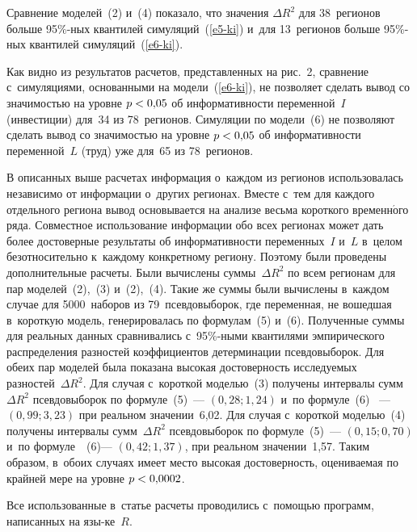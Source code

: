 \begin{multicols}{2}
   
  Сравнение моделей~(2) и~(4) показало, что значения $\Delta R^2$ для 38~регионов 
больше 95\%-ных квантилей симуляций~(\ref{e5-ki}) и~для 13~регионов больше 95\%-ных 
квантилей симуляций~(\ref{e6-ki}).





 Как видно из результатов расчетов, пред\-став\-лен\-ных на рис.~2, сравнение 
с~симуляциями, основанными на модели~(\ref{e6-ki}), не позволяет сделать вывод со 
значимостью на уровне $p\hm< 0{,}05$ об информативности переменной~$I$ 
(инвестиции) для~34 из 78~регионов. Симуляции по модели~(6) не позволяют сделать 
вывод со значимостью на уровне $p\hm< 0{,}05$ об информативности переменной~$L$ 
(труд) уже для~65 из 78~регионов.
  
  В описанных выше расчетах информация о~каж\-дом из регионов использовалась 
независимо от информации о~других регионах. Вместе с~тем для каждого 
отдельного региона вывод основывается на анализе весьма короткого 
временн$\acute{\mbox{о}}$го ряда. Совместное использование информации обо всех регионах 
может дать более достоверные результаты об информативности переменных~$I$ 
и~$L$ в~целом безотносительно к~каждому конкретному региону. Поэтому были 
проведены дополнительные расчеты. Были вычислены суммы~$\Delta R^2$ по всем 
регионам для пар моделей~(2),~(3) и~(2),~(4). 
Такие же суммы были вычислены в~каждом случае для 5000~наборов из 
79~псевдовыборок, где переменная, не вошедшая в~короткую модель, 
генерировалась по формулам~(5) и~(6). Полученные суммы для реальных данных 
сравнивались с~95\%-ными квантилями эмпирического распределения разностей 
коэффициентов 
детерминации псевдовыборок. Для обеих пар моделей была показана высокая 
достоверность исследуемых разностей~$\Delta R^2$. Для случая с~короткой 
моделью~(3) получены интервалы сумм~$\Delta R^2$ псевдовыборок по формуле~(5)~--- 
$ (0{,}28; 1{,}24)$ и~по формуле~(6) ~--- $(0{,}99; 3{,}23)$ при реальном 
значении~6,02. Для случая с~короткой моделью~(4) получены интервалы сумм~$\Delta 
R^2$ псевдовыборок по формуле~(5)~--- $ (0{,}15; 0{,}70)$ и~по формуле~~(6)--- 
$(0{,}42; 1{,}37)$, при реальном значении~1,57. Таким образом,
 в~обоих случаях имеет место 
высокая достоверность, оцениваемая по крайней мере на уровне $p\hm < 0{,}0002$.
  
  Все использованные в~статье расчеты проводились с~помощью программ, 
написанных на язы-\linebreak ке~$R$.


\end{multicols}
